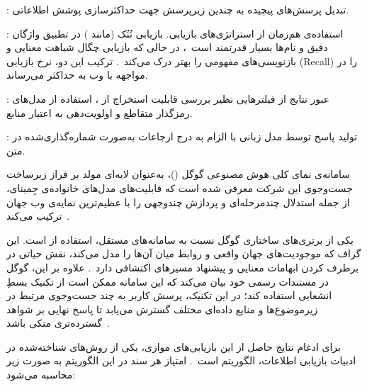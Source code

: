 : تبدیل پرسش‌های پیچیده به چندین زیرپرسش جهت حداکثرسازی پوشش اطلاعاتی.

: استفاده‌ی هم‌زمان از استراتژی‌های بازیابی. بازیابی تُنُک (مانند ) در تطبیق واژگان دقیق و نام‌ها بسیار قدرتمند است~، در حالی که بازیابی چگال شباهت معنایی و بازنویسی‌های مفهومی را بهتر درک می‌کند~. ترکیب این دو، نرخ بازیابی (Recall) را در مواجهه با وب به حداکثر می‌رساند.

: عبور نتایج از فیلترهایی نظیر بررسی قابلیت استخراج از ، استفاده از مدل‌های رمزگذار متقاطع و اولویت‌دهی به اعتبار منابع.

: تولید پاسخ توسط مدل زبانی با الزام به درج ارجاعات به‌صورت شماره‌گذاری‌شده در متن.




سامانه‌ی نمای کلی هوش مصنوعی گوگل ()، به‌عنوان لایه‌ای مولد بر فراز زیرساخت جست‌وجوی این شرکت معرفی شده است که قابلیت‌های مدل‌های خانواده‌ی جِمینای، از جمله استدلال چندمرحله‌ای و پردازش چندوجهی را با عظیم‌ترین نمایه‌ی وب جهان ترکیب می‌کند~.

یکی از برتری‌های ساختاری گوگل نسبت به سامانه‌های مستقل، استفاده از  است. این گراف که موجودیت‌های جهان واقعی و روابط میان آن‌ها را مدل می‌کند، نقش حیاتی در برطرف کردن ابهامات معنایی و پیشنهاد مسیرهای اکتشافی دارد~.
علاوه بر این، گوگل در مستندات رسمی خود بیان می‌کند که این سامانه ممکن است از تکنیک بسطِ انشعابی استفاده کند؛ در این تکنیک، پرسش کاربر به چند جست‌وجوی مرتبط در زیرموضوع‌ها و منابع داده‌ای مختلف گسترش می‌یابد تا پاسخ نهایی بر شواهد گسترده‌تری متکی باشد~. 

برای ادغام نتایج حاصل از این بازیابی‌های موازی، یکی از روش‌های شناخته‌شده در ادبیات بازیابی اطلاعات، الگوریتم  است~. امتیاز هر سند در این الگوریتم به صورت زیر محاسبه می‌شود:

